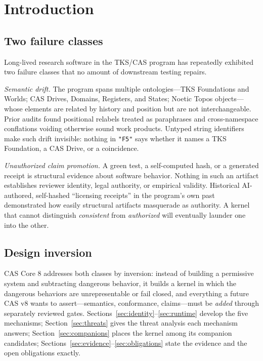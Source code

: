 \documentclass[11pt]{amsart}
\theoremstyle{definition}
\theoremstyle{remark}
\begin{document}
\section{Introduction}\label{sec:intro}

\subsection{Two failure classes}
Long-lived research software in the TKS/CAS program has repeatedly exhibited two failure classes that no amount of downstream testing repairs.

\emph{Semantic drift.} The program spans multiple ontologies---TKS Foundations and Worlds; CAS Drives, Domains, Registers, and States; Noetic Topos objects---whose elements are related by history and position but are not interchangeable. Prior audits found positional relabels treated as paraphrases and cross-namespace conflations voiding otherwise sound work products. Untyped string identifiers make such drift invisible: nothing in \texttt{"F5"} says whether it names a TKS Foundation, a CAS Drive, or a coincidence.

\emph{Unauthorized claim promotion.} A green test, a self-computed hash, or a generated receipt is structural evidence about software behavior. Nothing in such an artifact establishes reviewer identity, legal authority, or empirical validity. Historical AI-authored, self-hashed ``licensing receipts'' in the program's own past demonstrated how easily structural artifacts masquerade as authority. A kernel that cannot distinguish \emph{consistent} from \emph{authorized} will eventually launder one into the other.

\subsection{Design inversion}
CAS Core 8 addresses both classes by inversion: instead of building a permissive system and subtracting dangerous behavior, it builds a kernel in which the dangerous behaviors are unrepresentable or fail closed, and everything a future CAS v8 wants to assert---semantics, conformance, claims---must be \emph{added} through separately reviewed gates. Sections~\ref{sec:identity}--\ref{sec:runtime} develop the five mechanisms; Section~\ref{sec:threats} gives the threat analysis each mechanism answers; Section~\ref{sec:companions} places the kernel among its companion candidates; Sections~\ref{sec:evidence}--\ref{sec:obligations} state the evidence and the open obligations exactly.
\end{document}
